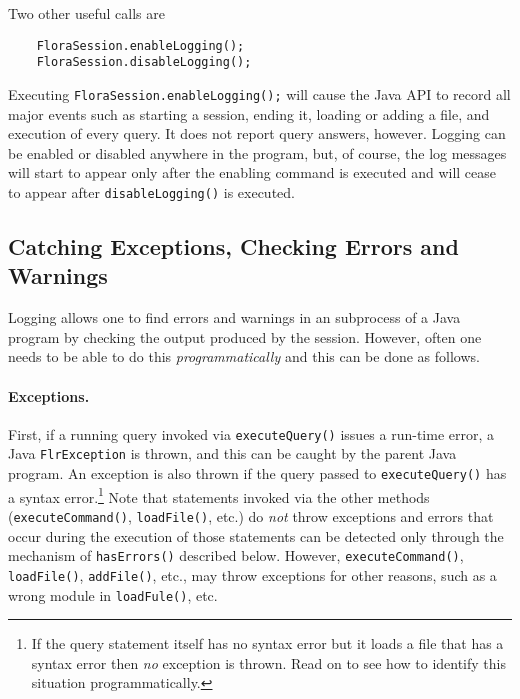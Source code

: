Two other useful calls are
\begin{verbatim}
    FloraSession.enableLogging();
    FloraSession.disableLogging();
\end{verbatim}
Executing \texttt{FloraSession.enableLogging();} will cause the Java API to
record all major events such as starting a session, ending it, loading or
adding a \FLSYSTEM file, and execution of every query. It does not report
query answers, however. Logging can be enabled or disabled anywhere in the
program, but, of course, the log messages will start to appear only after
the enabling command is executed and will cease to appear after
\texttt{disableLogging()} is executed. 

\subsection{Catching Exceptions, Checking Errors and Warnings}

Logging allows one to find errors and warnings in an \FLSYSTEM
subprocess of a Java program by checking the output produced by the session.
However, often one needs to be able to do this \emph{programmatically}  and
this can be done as follows.

\paragraph{Exceptions.} First, if a running \FLSYSTEM query invoked via
\texttt{executeQuery()}
issues a
run-time error, a Java \texttt{FlrException} is thrown, and this can be
caught by the parent Java program.
An exception is also thrown if the query passed to \texttt{executeQuery()}
has a syntax error.\footnote{
  If the query statement itself has no syntax error but it loads a file
  that has a syntax error then \emph{no} exception is thrown. Read on to
  see how to identify this situation programmatically.
}
Note that \FLSYSTEM statements invoked via 
the other methods (\texttt{executeCommand()},
\texttt{loadFile()}, etc.) do \emph{not} throw  exceptions and errors that
occur during the execution of those statements can be detected only through
the mechanism of \texttt{hasErrors()} described below. 
However, \texttt{executeCommand()}, \texttt{loadFile()},
\texttt{addFile()}, etc., may throw exceptions for other reasons, such as  
a wrong module in \texttt{loadFule()}, etc. 

